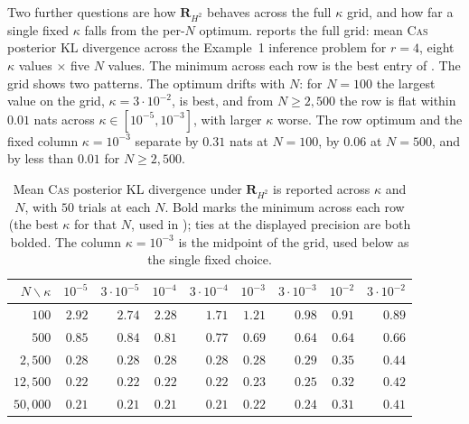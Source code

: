 \documentclass[supplement,review,hidelinks,onefignum,onetabnum]{siamart251216}
\newcommand{\mR}{\bm{R}}
\begin{document}
Two further questions are how $\mR_{H^2}$ behaves across the full $\kappa$ grid, and how far a single fixed $\kappa$ falls from the per-$N$ optimum.  reports the full grid: mean \textsc{Cas} posterior KL divergence across the Example~1 inference problem for $r=4$, eight $\kappa$ values $\times$ five $N$ values. The minimum across each row is the best entry of . The grid shows two patterns. The optimum drifts with $N$: for $N=100$ the largest value on the grid, $\kappa = 3\cdot10^{-2}$, is best, and from $N \geq 2{,}500$ the row is flat within $0.01$ nats across $\kappa \in [10^{-5}, 10^{-3}]$, with larger $\kappa$ worse. The row optimum and the fixed column $\kappa = 10^{-3}$ separate by $0.31$ nats at $N = 100$, by $0.06$ at $N = 500$, and by less than $0.01$ for $N \ge 2{,}500$.

\begin{table}[h]
\centering\small
\caption{Mean \textsc{Cas} posterior KL divergence under $\mR_{H^2}$ is reported across $\kappa$ and $N$, with $50$ trials at each $N$. Bold marks the minimum across each row (the best $\kappa$ for that $N$, used in ); ties at the displayed precision are both bolded. The column $\kappa = 10^{-3}$ is the midpoint of the grid, used below as the single fixed choice.}
\label{tab:dw-kappa-grid}
\begin{tabular}{r|rrrrrrrr}
\toprule
$N \backslash \kappa$ & $10^{-5}$ & $3\cdot 10^{-5}$ & $10^{-4}$ & $3\cdot 10^{-4}$ & $10^{-3}$ & $3\cdot 10^{-3}$ & $10^{-2}$ & $3\cdot 10^{-2}$ \\
\midrule
$100$       & $2.92$ & $2.74$ & $2.28$ & $1.71$ & $1.21$ & $0.98$ & $0.91$ & $\mathbf{0.89}$ \\
$500$       & $0.85$ & $0.84$ & $0.81$ & $0.77$ & $0.69$ & $\mathbf{0.64}$ & $\mathbf{0.64}$ & $0.66$ \\
$2{,}500$   & $\mathbf{0.28}$ & $\mathbf{0.28}$ & $\mathbf{0.28}$ & $\mathbf{0.28}$ & $\mathbf{0.28}$ & $0.29$ & $0.35$ & $0.44$ \\
$12{,}500$  & $\mathbf{0.22}$ & $\mathbf{0.22}$ & $\mathbf{0.22}$ & $\mathbf{0.22}$ & $0.23$ & $0.25$ & $0.32$ & $0.42$ \\
$50{,}000$  & $\mathbf{0.21}$ & $\mathbf{0.21}$ & $\mathbf{0.21}$ & $\mathbf{0.21}$ & $0.22$ & $0.24$ & $0.31$ & $0.41$ \\
\bottomrule
\end{tabular}
\end{table}
\end{document}
